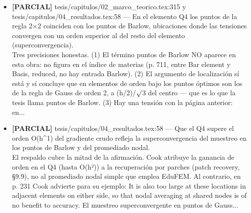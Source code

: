 \documentclass[11pt,a4paper]{article}
\newcommand{\campo}[1]{\textcolor{gris}{\footnotesize #1}}
\begin{document}
\begin{itemize}
\item \textbf{[PARCIAL]} tesis/capitulos/02\_marco\_teorico.tex:315 y tesis/capitulos/04\_resultados.tex:58 --- \textquotedbl{}En el elemento Q4 los puntos de la regla 2$\times$2 coinciden con los puntos de Barlow, ubicaciones donde las tensiones convergen con un orden superior al del resto del elemento (superconvergencia)\textquotedbl{}.
\\ \campo{Tres precisiones honestas. (1) El término \textquotedbl{}puntos de Barlow\textquotedbl{} NO aparece en esta obra: no figura en el índice de materias (p. 711, entre \textquotedbl{}Bar element\textquotedbl{} y \textquotedbl{}Basis, reduced\textquotedbl{}, no hay entrada Barlow). (2) El argumento de localización sí está y sí concluye que en elementos de orden bajo los puntos óptimos son los de la regla de Gauss de orden 2, a (h/2)/$\surd$3 del centro --- que es lo que la tesis llama puntos de Barlow. (3) Hay una tensión con la página anterior: en...}
\item \textbf{[PARCIAL]} tesis/capitulos/04\_resultados.tex:58 --- \textquotedbl{}Que el Q4 supere el orden O(h\textasciicircum{}1) del gradiente crudo refleja la superconvergencia del muestreo en los puntos de Barlow y del promediado nodal\textquotedbl{}.
\\ \campo{El respaldo cubre la mitad de la afirmación. Cook atribuye la ganancia de orden en el Q4 (hasta O(h²)) a la recuperación por parches (patch recovery, §9.9), no al promediado nodal simple que emplea EduFEM. Al contrario, en p. 231 Cook advierte para su ejemplo: \textquotedbl{}It is also too large at these locations in adjacent elements on either side, so that nodal averaging at shared nodes is of no benefit to accuracy.\textquotedbl{} El muestreo superconvergente en puntos de Gauss...}
\end{itemize}
\end{document}
